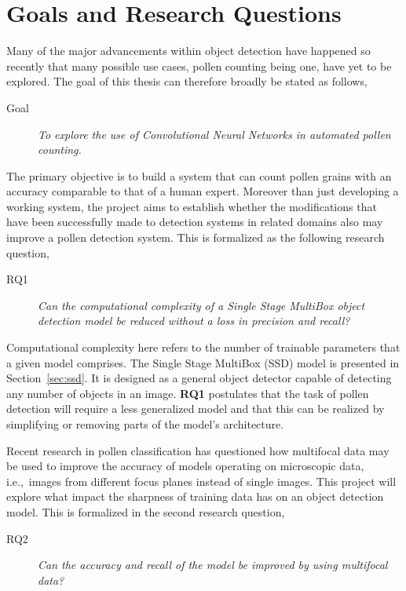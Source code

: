 \section{Goals and Research Questions}\label{sec:Goals and Research Questions}
Many of the major advancements within object detection have happened so recently that many possible use cases, pollen counting being one, have yet to be explored.
The goal of this thesis can therefore broadly be stated as follows,

\begin{description}
\item[Goal] \textit{To explore the use of Convolutional Neural Networks in automated pollen counting.}
\end{description}

The primary objective is to build a system that can count pollen grains with an accuracy comparable to that of a human expert.
Moreover than just developing a working system, the project aims to establish whether the modifications that have been successfully made to detection systems in related domains also may improve a pollen detection system.
This is formalized as the following research question,

\begin{description}
\item[RQ1] \textit{Can the computational complexity of a Single Stage MultiBox object detection model be reduced without a loss in precision and recall?}
\end{description}

Computational complexity here refers to the number of trainable parameters that a given model comprises.
The Single Stage MultiBox (SSD) model is presented in Section~\ref{sec:ssd}.
It is designed as a general object detector capable of detecting any number of objects in an image.
\textbf{RQ1} postulates that the task of pollen detection will require a less generalized model and that this can be realized by simplifying or removing parts of the model's architecture.

Recent research in pollen classification has questioned how multifocal data may be used to improve the accuracy of models operating on microscopic data, i.e.,\ images from different focus planes instead of single images.
This project will explore what impact the sharpness of training data has on an object detection model.
This is formalized in the second research question,

\begin{description}
    \item[RQ2] \textit{Can the accuracy and recall of the model be improved by using multifocal data?}
\end{description}

